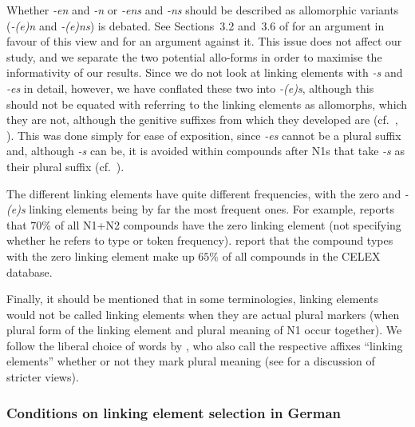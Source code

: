 Whether \textit{-en} and \textit{-n} or \textit{-ens} and \textit{-ns} should be described as allomorphic variants (\ie \textit{-(e)n} and \textit{-(e)ns}) is debated.
See Sections~3.2 and~3.6 of \textcite{NueblingSzczepaniak2013} for an argument in favour of this view and \textcite[33--36]{Neef2015} for an argument against it.
This issue does not affect our study, and we separate the two potential allo-forms in order to maximise the informativity of our results.
Since we do not look at linking elements with \textit{-s} and \textit{-es} in detail, however, we have conflated these two into \textit{-(e)s}, although this should not be equated with referring to the linking elements as allomorphs, which they are not, although the genitive suffixes from which they developed are (cf.\ \citealt[81]{Szczepaniak2016,NueblingSzczepaniak2013}, ).
This was done simply for ease of exposition, since \textit{-es} cannot be a plural suffix and, although \textit{-s} can be, it is avoided within compounds after N1s that take \textit{-s} as their plural suffix (cf.\ \citealt{Wegener2003,Wegener2005,NueblingSzczepaniak2013}).

The different linking elements have quite different frequencies, with the zero and \textit{-(e)s} linking elements being by far the most frequent ones.
For example, \textcite[177]{Gallmann1998} reports that $70\%$ of all N1+N2 compounds have the zero linking element (not specifying whether he refers to type or token frequency).
\textcite[29]{KrottEa2007} report that the compound types with the zero linking element make up $65\%$ of all compounds in the CELEX database.

Finally, it should be mentioned that in some terminologies, linking elements would not be called linking elements when they are actual plural markers (\ie when plural form of the linking element and plural meaning of N1 occur together).
We follow the liberal choice of words by \textcite{BangaEa2013b}, who also call the respective affixes ``linking elements'' whether or not they mark plural meaning (see \citealt[196]{BangaEa2013b} for a discussion of stricter views).

\subsubsection{Conditions on linking element selection in German}
\label{sec:conditionsonlinkageselectioningerman}


